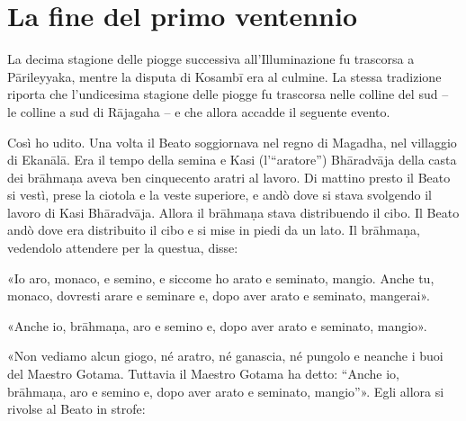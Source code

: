 \chapter{La fine del primo ventennio}

 La decima stagione delle piogge successiva
all’Illuminazione fu trascorsa a Pārileyyaka, mentre la disputa di
Kosambī era al culmine. La stessa tradizione riporta che l’undicesima
stagione delle piogge fu trascorsa nelle colline del sud – le colline a
sud di Rājagaha – e che allora accadde il seguente evento.


 Così ho udito. Una volta il Beato soggiornava nel regno di
Magadha, nel villaggio di Ekanālā. Era il tempo della semina e Kasi
(l’“aratore”) Bhāradvāja della casta dei brāhmaṇa aveva ben cinquecento
aratri al lavoro. Di mattino presto il Beato si vestì, prese la ciotola
e la veste superiore, e andò dove si stava svolgendo il lavoro di Kasi
Bhāradvāja. Allora il brāhmaṇa stava distribuendo il cibo. Il Beato andò
dove era distribuito il cibo e si mise in piedi da un lato. Il brāhmaṇa,
vedendolo attendere per la questua, disse:


«Io aro, monaco, e semino, e siccome ho arato e seminato, mangio. Anche
tu, monaco, dovresti arare e seminare e, dopo aver arato e seminato,
mangerai».


«Anche io, brāhmaṇa, aro e semino e, dopo aver arato e seminato,
mangio».


«Non vediamo alcun giogo, né aratro, né ganascia, né pungolo e neanche i
buoi del Maestro Gotama. Tuttavia il Maestro Gotama ha detto: “Anche io,
brāhmaṇa, aro e semino e, dopo aver arato e seminato, mangio”». Egli
allora si rivolse al Beato in strofe:


